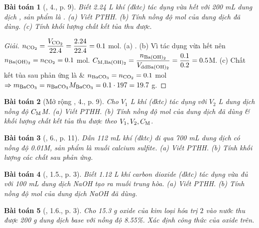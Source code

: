 \documentclass{article}
\newtheorem{baitoan}{Bài toán}
\begin{document}
\begin{baitoan}[\cite{SGK_Hoa_Hoc_9}, 4., p. 9]
	Biết \emph{2.24 L} khí \emph{} (đktc) tác dụng vừa hết với \emph{200 mL} dung dịch \emph{}, sản phẩm là \emph{}. (a) Viết PTHH. (b) Tính nồng độ mol của dung dịch \emph{} đã dùng. (c) Tính khối lượng chất kết tủa thu được.
\end{baitoan}

\begin{proof}[Giải]
	$n_{\ce{CO2}} = \dfrac{V_{\ce{CO2}}}{22.4} = \dfrac{2.24}{22.4} = 0.1$ mol. (a) . (b) Vì  tác dụng vừa hết nên $n_{\ce{Ba(OH)2}} = n_{\ce{CO2}} = 0.1$ mol. $C_{\rm M,\ce{Ba(OH)2}} = \dfrac{n_{\ce{Ba(OH)2}}}{V_{\rm dd\ce{Ba(OH)2}}} = \dfrac{0.1}{0.2} = 0.5$M. (c) Chất kết tủa sau phản ứng là  \& $n_{\ce{BaCO3}} = n_{\ce{CO2}} = 0.1$ mol $\Rightarrow m_{\ce{BaCO3}} = n_{\ce{BaCO3}}M_{\ce{BaCO3}} = 0.1\cdot197 = 19.7$ g.
\end{proof}

\begin{baitoan}[Mở rộng \cite{SGK_Hoa_Hoc_9}, 4., p. 9]
	Cho $V_1$ \emph{L} khí \emph{} (đktc) tác dụng với $V_2$ \emph{L} dung dịch \emph{} nồng độ $C_{\rm M}$\emph{M}. (a) Viết PTHH. (b) Tính nồng độ mol của dung dịch \emph{} đã dùng \& khối lượng chất kết tủa thu được theo $V_1,V_2,C_{\rm M}$.
\end{baitoan}

\begin{baitoan}[\cite{SGK_Hoa_Hoc_9}, 6., p. 11]
	Dẫn \emph{112 mL} khí \emph{} (đktc) đi qua \emph{700 mL} dung dịch \emph{} có nồng độ \emph{0.01M}, sản phẩm là muối calcium sulfite. (a) Viết PTHH. (b) Tính khối lượng các chất sau phản ứng.
\end{baitoan}

\begin{baitoan}[\cite{SBT_Hoa_Hoc_9}, 1.5., p. 3]
	Biết \emph{1.12 L} khí carbon dioxide (đktc) tác dụng vừa đủ với \emph{100 mL} dung dịch \emph{NaOH} tạo ra muối trung hòa. (a) Viết PTHH. (b) Tính nồng độ mol của dung dịch \emph{NaOH} đã dùng.	
\end{baitoan}

\begin{baitoan}[\cite{SBT_Hoa_Hoc_9}, 1.6., p. 3]
	Cho \emph{15.3 g} oxide của kim loại hóa trị $2$ vào nước thu được \emph{200 g} dung dịch base với nồng độ \emph{8.55\%}. Xác định công thức của oxide trên.
\end{baitoan}
\end{document}
